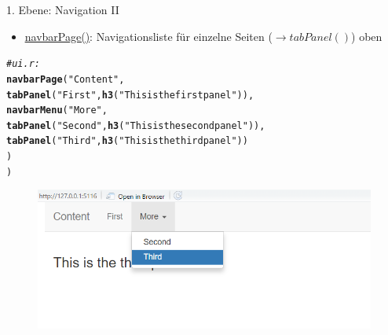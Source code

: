 \documentclass[xcolor=dvipsnames]{beamer}\usepackage[]{graphicx}\usepackage[]{color}
\makeatletter
\newcommand{\hlstr}[1]{\textcolor[rgb]{0.192,0.494,0.8}{#1}}%
\newcommand{\hlcom}[1]{\textcolor[rgb]{0.678,0.584,0.686}{\textit{#1}}}%
\newcommand{\hlstd}[1]{\textcolor[rgb]{0.345,0.345,0.345}{#1}}%
\newcommand{\hlkwd}[1]{\textcolor[rgb]{0.737,0.353,0.396}{\textbf{#1}}}%
\newenvironment{kframe}{%
 \def\at@end@of@kframe{}%
 \ifinner\ifhmode%
  \def\at@end@of@kframe{\end{minipage}}%
  \begin{minipage}{\columnwidth}%
 \fi\fi%
 \def\FrameCommand##1{\hskip\@totalleftmargin \hskip-\fboxsep
 \colorbox{shadecolor}{##1}\hskip-\fboxsep
     \hskip-\linewidth \hskip-\@totalleftmargin \hskip\columnwidth}%
 \MakeFramed {\advance\hsize-\width
   \@totalleftmargin\z@ \linewidth\hsize
   \@setminipage}}%
 {\par\unskip\endMakeFramed%
 \at@end@of@kframe}
\newenvironment{knitrout}{}{} %
\makeatother
\begin{document}
\begin{frame}[fragile]{1. Ebene: Navigation II}
  \begin{itemize}
    \item \href{https://shiny.rstudio.com/gallery/navbar-example.html}{\underline{navbarPage()}}: Navigationsliste für einzelne Seiten ($\rightarrow tabPanel()$) oben
  \end{itemize}
\begin{knitrout}\small
{}\color{fgcolor}\begin{kframe}
\begin{alltt}
\hlcom{#ui.r:}
\hlkwd{navbarPage}\hlstd{(}\hlstr{"Content"}\hlstd{,}
  \hlkwd{tabPanel}\hlstd{(}\hlstr{"First"}\hlstd{,} \hlkwd{h3}\hlstd{(}\hlstr{"This is the first panel"}\hlstd{)),}
  \hlkwd{navbarMenu}\hlstd{(}\hlstr{"More"}\hlstd{,}
    \hlkwd{tabPanel}\hlstd{(}\hlstr{"Second"}\hlstd{,} \hlkwd{h3}\hlstd{(}\hlstr{"This is the second panel"}\hlstd{)),}
    \hlkwd{tabPanel}\hlstd{(}\hlstr{"Third"}\hlstd{,} \hlkwd{h3}\hlstd{(}\hlstr{"This is the third panel"}\hlstd{))}
  \hlstd{)}
\hlstd{)}
\end{alltt}
\end{kframe}
\end{knitrout}
  \begin{figure}
  	\centering
  	\includegraphics[width=1\textwidth]{figure/navbarPage.png}
  \end{figure}
\end{frame}  
\end{document}
